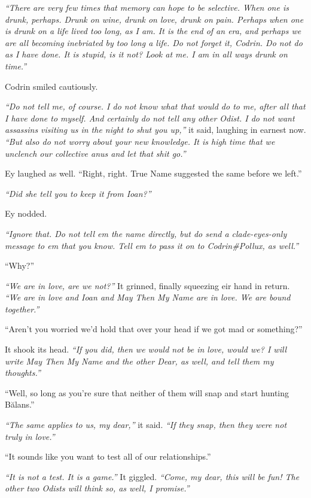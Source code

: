 \emph{``There are very few times that memory can hope to be selective. When one is drunk, perhaps. Drunk on wine, drunk on love, drunk on pain. Perhaps when one is drunk on a life lived too long, as I am. It is the end of an era, and perhaps we are all becoming inebriated by too long a life. Do not forget it, Codrin. Do not do as I have done. It is stupid, is it not? Look at me. I am in all ways drunk on time.''}

Codrin smiled cautiously.

\emph{``Do not tell me, of course. I do not know what that would do to me, after all that I have done to myself. And certainly do not tell any other Odist. I do not want assassins visiting us in the night to shut you up,''} it said, laughing in earnest now. \emph{``But also do not worry about your new knowledge. It is high time that we unclench our collective anus and let that shit go.''}

Ey laughed as well. ``Right, right. True Name suggested the same before we left.''

\emph{``Did she tell you to keep it from Ioan?''}

Ey nodded.

\emph{``Ignore that. Do not tell em the name directly, but do send a clade-eyes-only message to em that you know. Tell em to pass it on to Codrin\#Pollux, as well.''}

``Why?''

\emph{``We are in love, are we not?''} It grinned, finally squeezing eir hand in return. \emph{``We are in love and Ioan and May Then My Name are in love. We are bound together.''}

``Aren't you worried we'd hold that over your head if we got mad or something?''

It shook its head. \emph{``If you did, then we would not be in love, would we? I will write May Then My Name and the other Dear, as well, and tell them my thoughts.''}

``Well, so long as you're sure that neither of them will snap and start hunting Bălans.''

\emph{``The same applies to us, my dear,''} it said. \emph{``If they snap, then they were not truly in love.''}

``It sounds like you want to test all of our relationships.''

\emph{``It is not a test. It is a game.''} It giggled. \emph{``Come, my dear, this will be fun! The other two Odists will think so, as well, I promise.''}

